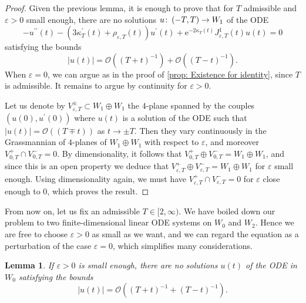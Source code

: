 \documentclass{article}
\numberwithin{equation}{section}        %
\theoremstyle{bfnote}
\newtheorem{lem}[thm]{Lemma}                %
\theoremstyle{definition}
\theoremstyle{bfremark}
\newcommand{\col}{\colon \thinspace}        %
\begin{document}
\begin{proof}
    Given the previous lemma, it is enough to prove that for $T$ admissible and $\varepsilon > 0$ small enough, there are no solutions $u \col (-T,T) \rightarrow W_1$ of the ODE
    \begin{equation*}
        -u^{\prime\prime}(t) - (3 \kappa^\prime_T(t) + \rho_{\varepsilon,T}(t)) u^\prime(t)  + \mathrm{e}^{-2\kappa_T(t)}J^1_{\varepsilon,T}(t)u(t) = 0
    \end{equation*}
    satisfying the bounds
    \begin{equation*}
        |u(t)| = \mathcal{O}((T+t)^{-1}) + \mathcal{O}((T-t)^{-1}) .
    \end{equation*}
    When $\varepsilon = 0$, we can argue as in the proof of \cref{prop: Existence for identity}, since $T$ is admissible. It remains to argue by continuity for $\varepsilon > 0$. 
    
    Let us denote by $V^\pm_{\varepsilon,T} \subset W_1 \oplus W_1$ the $4$-plane spanned by the couples $(u(0),u^\prime(0))$ where $u(t)$ is a solution of the ODE such that $|u(t)| = \mathcal{O}((T \mp t))$ as $t \rightarrow \pm T$. Then they vary continuously in the Grassmannian of $4$-planes of $W_1 \oplus W_1$ with respect to $\varepsilon$, and moreover $V^+_{0,T} \cap V^-_{0,T} = 0$. By dimensionality, it follows that $V^+_{0,T} \oplus V^-_{0,T} = W_1 \oplus W_1$, and since this is an open property we deduce that $V^+_{\varepsilon,T} \oplus V^-_{\varepsilon,T} = W_1 \oplus W_1$ for $\varepsilon$ small enough. Using dimensionality again, we must have $V^+_{\varepsilon,T} \cap V^-_{\varepsilon,T} = 0$ for $\varepsilon$ close enough to $0$, which proves the result.
\end{proof}

From now on, let us fix an admissible $T \in [2,\infty)$. We have boiled down our problem to two finite-dimensional linear ODE systems on $W_0$ and $W_2$. Hence we are free to choose $\varepsilon > 0$ as small as we want, and we can regard the equation as a perturbation of the case $\varepsilon = 0$, which simplifies many considerations. 

\begin{lem}     \label{lem: rule out W_0}
    If $\varepsilon > 0$ is small enough, there are no solutions $u(t)$ of the ODE in $W_0$ satisfying the bounds
    \begin{equation*}
        |u(t)| = \mathcal{O}((T+t)^{-1} + (T-t)^{-1}) .
    \end{equation*}
\end{lem}
\end{document}
